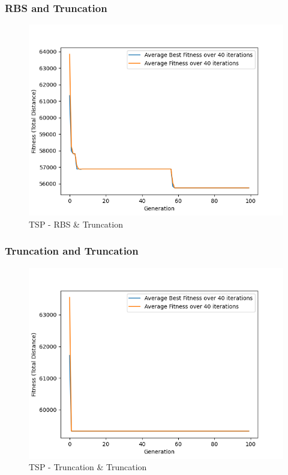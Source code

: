 \documentclass[11pt, letterpaper]{article}
\begin{document}
\subsubsection {RBS and Truncation}
\begin{figure}[h]
    \centering
    \includegraphics[scale = 0.6]{images/tsp_rb_tr.png}
    \caption {TSP - RBS \& Truncation}
    \label {fig:tpsBT}
\end{figure}

\subsubsection {Truncation and Truncation}

\begin{figure}[H]
    \centering
    \includegraphics[scale = 0.6]{images/tsp_tr_tr.png}
    \caption {TSP - Truncation \& Truncation}
    \label {fig:tpsTT}
\end{figure}
\end{document}
